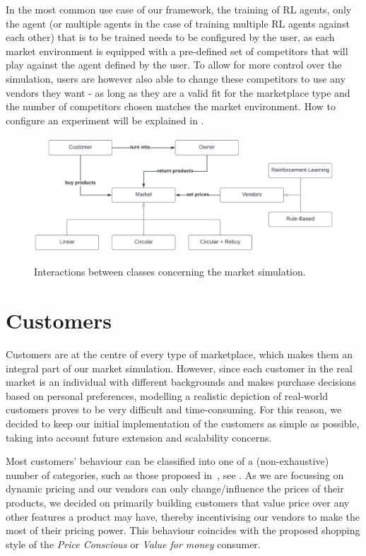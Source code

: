 In the most common use case of our framework, the training of RL agents, only the agent (or multiple agents in the case of training multiple RL agents against each other) that is to be trained needs to be configured by the user, as each market environment is equipped with a pre-defined set of competitors that will play against the agent defined by the user. To allow for more control over the simulation, users are however also able to change these competitors to use any vendors they want - as long as they are a valid fit for the marketplace type and the number of competitors chosen matches the market environment. How to configure an experiment will be explained in .

\begin{figure}[t]
	\centering
	\includegraphics[width = \textwidth]{images/overview_diagram.pdf}\\
	\caption{Interactions between classes concerning the market simulation.\\}\label{fig:OverviewDiagram}
\end{figure}

\section{Customers}\label{sec:Customers}

Customers are at the centre of every type of marketplace, which makes them an integral part of our market simulation. However, since each customer in the real market is an individual with different backgrounds and makes purchase decisions based on personal preferences, modelling a realistic depiction of real-world customers proves to be very difficult and time-consuming. For this reason, we decided to keep our initial implementation of the customers as simple as possible, taking into account future extension and scalability concerns.

Most customers' behaviour can be classified into one of a (non-exhaustive) number of categories, such as those proposed in~\cite{ShoppingStyles}, see . As we are focussing on dynamic pricing and our vendors can only change/influence the prices of their products, we decided on primarily building customers that value price over any other features a product may have, thereby incentivising our vendors to make the most of their pricing power. This behaviour coincides with the proposed shopping style of the \emph{Price Conscious} or \emph{Value for money} consumer.

